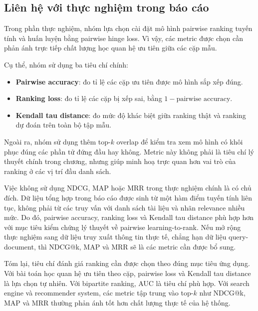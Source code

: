 \subsection{Liên hệ với thực nghiệm trong báo cáo}

Trong phần thực nghiệm, nhóm lựa chọn cài đặt mô hình pairwise ranking tuyến tính và huấn luyện bằng pairwise hinge loss. Vì vậy, các metric được chọn cần phản ánh trực tiếp chất lượng học quan hệ ưu tiên giữa các cặp mẫu.

Cụ thể, nhóm sử dụng ba tiêu chí chính:
\begin{itemize}
    \item \textbf{Pairwise accuracy}: đo tỉ lệ các cặp ưu tiên được mô hình sắp xếp đúng.
    \item \textbf{Ranking loss}: đo tỉ lệ các cặp bị xếp sai, bằng \(1 - \text{pairwise accuracy}\).
    \item \textbf{Kendall tau distance}: đo mức độ khác biệt giữa ranking thật và ranking dự đoán trên toàn bộ tập mẫu.
\end{itemize}

Ngoài ra, nhóm sử dụng thêm top-\(k\) overlap để kiểm tra xem mô hình có khôi phục đúng các phần tử đứng đầu hay không. Metric này không phải là tiêu chí lý thuyết chính trong chương, nhưng giúp minh hoạ trực quan hơn vai trò của ranking ở các vị trí đầu danh sách.

Việc không sử dụng NDCG, MAP hoặc MRR trong thực nghiệm chính là có chủ đích. Dữ liệu tổng hợp trong báo cáo được sinh từ một hàm điểm tuyến tính liên tục, không phải từ các truy vấn với danh sách tài liệu và nhãn relevance nhiều mức. Do đó, pairwise accuracy, ranking loss và Kendall tau distance phù hợp hơn với mục tiêu kiểm chứng lý thuyết về pairwise learning-to-rank. Nếu mở rộng thực nghiệm sang dữ liệu truy xuất thông tin thực tế, chẳng hạn dữ liệu query-document, thì NDCG@k, MAP và MRR sẽ là các metric cần được bổ sung.

Tóm lại, tiêu chí đánh giá ranking cần được chọn theo đúng mục tiêu ứng dụng. Với bài toán học quan hệ ưu tiên theo cặp, pairwise loss và Kendall tau distance là lựa chọn tự nhiên. Với bipartite ranking, AUC là tiêu chí phù hợp. Với search engine và recommender system, các metric tập trung vào top-\(k\) như NDCG@k, MAP và MRR thường phản ánh tốt hơn chất lượng thực tế của hệ thống.